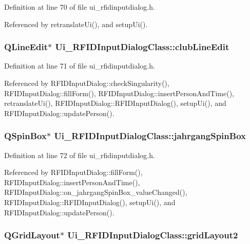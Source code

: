 Definition at line 70 of file ui\_\-rfidinputdialog.h.

Referenced by retranslateUi(), and setupUi().\hypertarget{class_ui___r_f_i_d_input_dialog_class_ab05223309a28747a07d0ed753b2a462}{
\subsubsection[clubLineEdit]{\setlength{\rightskip}{0pt plus 5cm}QLineEdit$\ast$ {\bf Ui\_\-RFIDInputDialogClass::clubLineEdit}}}
\label{class_ui___r_f_i_d_input_dialog_class_ab05223309a28747a07d0ed753b2a462}




Definition at line 71 of file ui\_\-rfidinputdialog.h.

Referenced by RFIDInputDialog::checkSingularity(), RFIDInputDialog::fillForm(), RFIDInputDialog::insertPersonAndTime(), retranslateUi(), RFIDInputDialog::RFIDInputDialog(), setupUi(), and RFIDInputDialog::updatePerson().\hypertarget{class_ui___r_f_i_d_input_dialog_class_049ac450ed517de9f065df16c1ab6dd6}{
\subsubsection[jahrgangSpinBox]{\setlength{\rightskip}{0pt plus 5cm}QSpinBox$\ast$ {\bf Ui\_\-RFIDInputDialogClass::jahrgangSpinBox}}}
\label{class_ui___r_f_i_d_input_dialog_class_049ac450ed517de9f065df16c1ab6dd6}




Definition at line 72 of file ui\_\-rfidinputdialog.h.

Referenced by RFIDInputDialog::fillForm(), RFIDInputDialog::insertPersonAndTime(), RFIDInputDialog::on\_\-jahrgangSpinBox\_\-valueChanged(), RFIDInputDialog::RFIDInputDialog(), setupUi(), and RFIDInputDialog::updatePerson().\hypertarget{class_ui___r_f_i_d_input_dialog_class_44a496c71adef62652c814b3b53865a1}{
\subsubsection[gridLayout2]{\setlength{\rightskip}{0pt plus 5cm}QGridLayout$\ast$ {\bf Ui\_\-RFIDInputDialogClass::gridLayout2}}}
\label{class_ui___r_f_i_d_input_dialog_class_44a496c71adef62652c814b3b53865a1}




